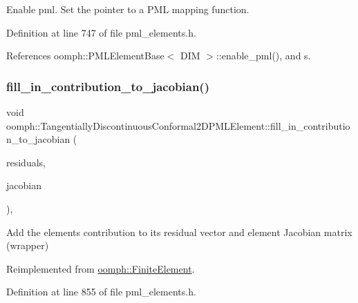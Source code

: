 Enable pml. Set the pointer to a P\+ML mapping function. 



Definition at line 747 of file pml\+\_\+elements.\+h.



References oomph\+::\+P\+M\+L\+Element\+Base$<$ D\+I\+M $>$\+::enable\+\_\+pml(), and s.

\mbox{\label{classoomph_1_1TangentiallyDiscontinuousConformal2DPMLElement_a0ed7e453ed779544372498057d197e6a}} 
\subsubsection{\texorpdfstring{fill\+\_\+in\+\_\+contribution\+\_\+to\+\_\+jacobian()}{fill\_in\_contribution\_to\_jacobian()}}
{\footnotesize\ttfamily void oomph\+::\+Tangentially\+Discontinuous\+Conformal2\+D\+P\+M\+L\+Element\+::fill\+\_\+in\+\_\+contribution\+\_\+to\+\_\+jacobian (\begin{DoxyParamCaption}\item[{\hyperlink{classoomph_1_1Vector}{Vector}$<$ double $>$ \&}]{residuals,  }\item[{\hyperlink{classoomph_1_1DenseMatrix}{Dense\+Matrix}$<$ double $>$ \&}]{jacobian }\end{DoxyParamCaption})\hspace{0.3cm}{\ttfamily [inline]}, {\ttfamily [virtual]}}



Add the element\textquotesingle{}s contribution to its residual vector and element Jacobian matrix (wrapper) 



Reimplemented from \hyperlink{classoomph_1_1FiniteElement_a0ae7af222af38a0d53bf283dc85bdfea}{oomph\+::\+Finite\+Element}.



Definition at line 855 of file pml\+\_\+elements.\+h.

